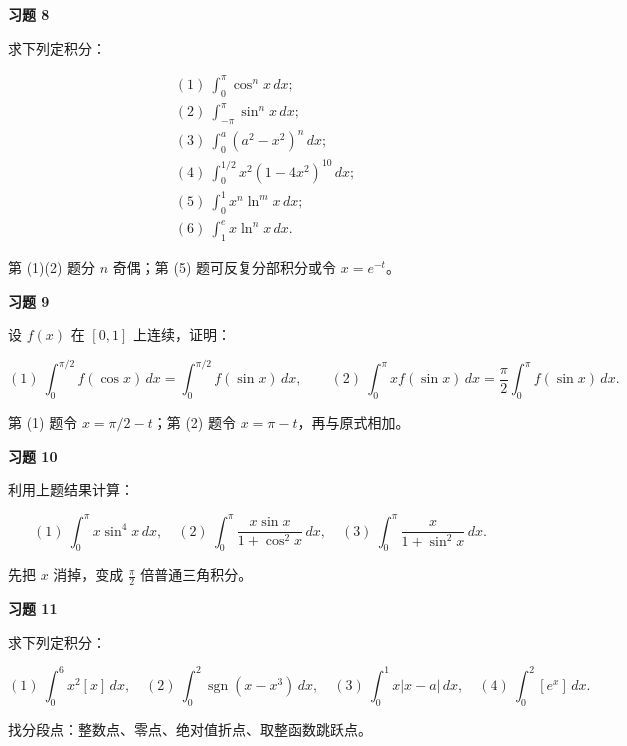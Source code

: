 \begin{exercisebox}
\textbf{习题 8 }

求下列定积分：

\[
      \begin{aligned}
      &(1)\ \int_0^\pi \cos^n x\,dx;\\
      &(2)\ \int_{-\pi}^{\pi}\sin^n x\,dx;\\
      &(3)\ \int_0^a(a^2-x^2)^n\,dx;\\
      &(4)\ \int_0^{1/2}x^2(1-4x^2)^{10}\,dx;\\
      &(5)\ \int_0^1 x^n\ln^m x\,dx;\\
      &(6)\ \int_1^e x\ln^n x\,dx.
      \end{aligned}
      \]

\begin{hintbox}
第 (1)(2) 题分 \(n\) 奇偶；第 (5) 题可反复分部积分或令 \(x=e^{-t}\)。
\end{hintbox}
\end{exercisebox}

\begin{exercisebox}
\textbf{习题 9 }

设 \(f(x)\) 在 \([0,1]\) 上连续，证明：

\[
      (1)\ \int_0^{\pi/2}f(\cos x)\,dx=\int_0^{\pi/2}f(\sin x)\,dx,
      \qquad
      (2)\ \int_0^\pi x f(\sin x)\,dx=\frac{\pi}{2}\int_0^\pi f(\sin x)\,dx.
      \]

\begin{hintbox}
第 (1) 题令 \(x=\pi/2-t\)；第 (2) 题令 \(x=\pi-t\)，再与原式相加。
\end{hintbox}
\end{exercisebox}

\begin{exercisebox}
\textbf{习题 10 }

利用上题结果计算：

\[
      (1)\ \int_0^\pi x\sin^4x\,dx,\quad
      (2)\ \int_0^\pi \frac{x\sin x}{1+\cos^2x}\,dx,\quad
      (3)\ \int_0^\pi \frac{x}{1+\sin^2x}\,dx.
      \]

\begin{hintbox}
先把 \(x\) 消掉，变成 \(\frac{\pi}{2}\) 倍普通三角积分。
\end{hintbox}
\end{exercisebox}

\begin{exercisebox}
\textbf{习题 11 }

求下列定积分：

\[
      (1)\ \int_0^6 x^2[x]\,dx,\quad
      (2)\ \int_0^2\operatorname{sgn}(x-x^3)\,dx,\quad
      (3)\ \int_0^1 x|x-a|\,dx,\quad
      (4)\ \int_0^2[e^x]\,dx.
      \]

\begin{hintbox}
找分段点：整数点、零点、绝对值折点、取整函数跳跃点。
\end{hintbox}
\end{exercisebox}

